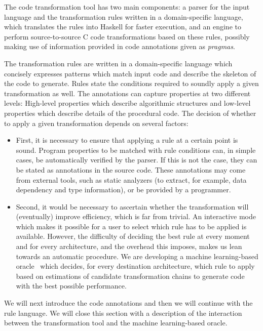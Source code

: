 \documentclass[svgnames,usenames,preprint,nocopyrightspace]{sigplanconf}
\begin{document}
The code transformation tool has two main components: a parser for the
input language and the transformation rules written in a domain-specific language, which
translates the rules into Haskell for faster execution, and an engine to
perform source-to-source C code transformations based on these rules,
possibly making use of information provided in code annotations given
as \emph{pragmas}.


The transformation rules are written in a domain-specific language
which concisely expresses patterns which match input code and describe
the skeleton of the code to generate.  Rules state
the conditions required to soundly apply a given transformation as
well.  The annotations can capture properties at two different levels:
High-level properties which describe algorithmic structures and
low-level properties which describe details of the procedural code.
The decision of whether to apply a given transformation depends on
several factors:

\begin{itemize}
\item First, it is necessary to ensure that applying a rule at a
  certain point is sound.  Program properties to be matched with rule
  conditions can, in simple cases, be automatically verified by the
parser.
If this is not the case, they can be stated as annotations in the
  source code.  These annotations
may come from external tools, such as static analyzers (to extract,
  for example, data dependency and type information), 
or
be provided by a programmer.
\item Second, it would be necessary to ascertain whether the
  transformation will (eventually) improve efficiency, which is far
  from trivial.  An interactive mode which makes it possible for a
  user to select which rule has to be applied is available.  However,
  the difficulty of deciding the best rule at every moment and for
  every architecture, and the overhead this imposes, makes us lean
  towards an automatic procedure.  We are developing a machine
  learning-based oracle~\cite{vigueras16:learning_code_trans} which
  decides, for every destination architecture, which rule to apply
  based on estimations of candidate transformation chains to generate
  code with the best possible performance.




\end{itemize}

We will next introduce the code annotations
and then we will continue with the rule language.  We will close this
section with a description of the interaction between the
transformation tool and the machine learning-based oracle.
\end{document}
